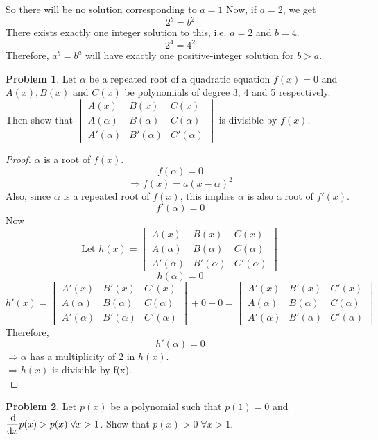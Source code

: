 \documentclass[14]{article}
\theoremstyle{definition}
\newtheorem{prob}{Problem}
\theoremstyle{case}
\begin{document}
So there will be no solution corresponding to $a = 1$
Now, if $a = 2$, we get
\[2^b = b^2\]
There exists exactly one integer solution to this, i.e. $a = 2$ and $b = 4$.
\[2^4 = 4^2\]
Therefore, $a^b = b^a$ will have exactly one positive-integer solution for $b > a$.
\pagebreak
\begin{prob}
Let $\alpha$ be a repeated root of a quadratic equation $f(x) = 0$ and $A(x), B(x)$ and $C(x)$ be polynomials of degree 3, 4 and 5 respectively. Then show that $\begin{vmatrix}
A(x)&B(x)&C(x)\\A(\alpha)&B(\alpha)&C(\alpha)\\A'(\alpha)&B'(\alpha)&C'(\alpha)
\end{vmatrix}$ is divisible by $f(x)$.
\end{prob}
\begin{proof}
$\alpha$ is a root of $f(x)$. 
\[
f(\alpha) = 0
\]
\[
\Rightarrow f(x) = a(x - \alpha)^2
\]
Also, since $\alpha$ is a repeated root of $f(x)$, this implies $\alpha$ is also a root of $f'(x)$.
\[f'(\alpha) = 0\]
Now
\[\text{Let } h(x) = \begin{vmatrix}
A(x)&B(x)&C(x)\\A(\alpha)&B(\alpha)&C(\alpha)\\A'(\alpha)&B'(\alpha)&C'(\alpha)
\end{vmatrix}\]
\[h(\alpha) = 0\]
\[h'(x) = \begin{vmatrix}
A'(x)&B'(x)&C'(x)\\A(\alpha)&B(\alpha)&C(\alpha)\\A'(\alpha)&B'(\alpha)&C'(\alpha)
\end{vmatrix} + 0 + 0 = \begin{vmatrix}
A'(x)&B'(x)&C'(x)\\A(\alpha)&B(\alpha)&C(\alpha)\\A'(\alpha)&B'(\alpha)&C'(\alpha)
\end{vmatrix}\]
Therefore,
\[h'(\alpha) = 0\]
$\Rightarrow \alpha$ has a multiplicity of $2$ in $h(x)$.\\
$\Rightarrow h(x)$ is divisible by f(x).\\
\end{proof}
\begin{prob}
Let $p(x)$ be a polynomial such that $p(1) = 0$ and $\dfrac{\dif}{\dif x} p(x) > p(x) \; \forall x > 1$. Show that $p(x) > 0 \; \forall x > 1$. 
\end{prob}
\end{document}
